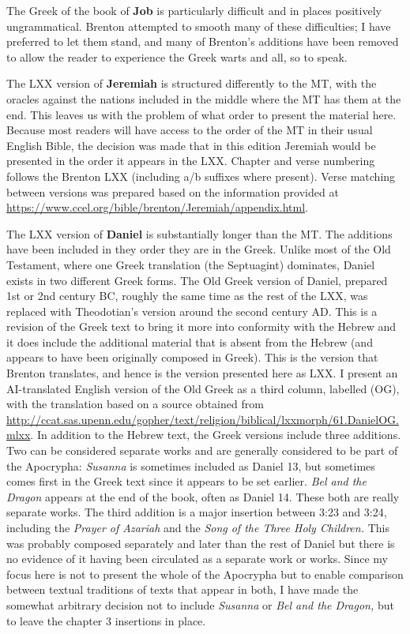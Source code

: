 {{The Greek of the book of \textbf{Job} is particularly difficult and in places positively ungrammatical. Brenton attempted to smooth many of these difficulties; I have preferred to let them stand, and many of Brenton's additions have been removed to allow the reader to experience the Greek warts and all, so to speak.

The LXX version of \textbf{Jeremiah} is structured differently to the MT, with the oracles against the nations included in the middle where the MT has them at the end. This leaves us with the problem of what order to present the material here. Because most readers will have access to the order of the MT in their usual English Bible, the decision was made that in this edition Jeremiah would be presented in the order it appears in the LXX. Chapter and verse numbering follows
the Brenton LXX (including a/b suffixes where present). Verse matching between versions was prepared based on the information provided at \url{https://www.ccel.org/bible/brenton/Jeremiah/appendix.html}. 

The LXX version of \textbf{Daniel} is substantially longer than the MT.  The additions have been included in they order they are in the Greek. Unlike most of the Old Testament, where one Greek translation (the Septuagint) dominates, Daniel exists in two different Greek forms. The Old Greek version of Daniel, prepared 1st or 2nd century BC, roughly the same time as the rest of the LXX, was replaced with Theodotian's version around the second century AD. This is a revision of the Greek text to bring it more into conformity with the Hebrew and it does include the additional material that is absent from the Hebrew (and appears to have been originally composed in Greek). This is the version that Brenton translates, and hence is the version presented here as LXX. I present an AI-translated English version of the Old Greek as a third column, labelled (OG), with the translation based on a source obtained from \url{http://ccat.sas.upenn.edu/gopher/text/religion/biblical/lxxmorph/61.DanielOG.mlxx}. In addition to the Hebrew text, the Greek versions include three additions. Two can be considered separate works and are generally considered to be part of the Apocrypha: \textit{Susanna}\/ is sometimes included as Daniel 13, but sometimes comes first in the Greek text since it appears to be set earlier. \textit{Bel and the Dragon}\/ appears at the end of the book, often as Daniel 14. These both are really separate works. The third addition is a major insertion between 3:23 and 3:24, including the \textit{Prayer of Azariah} and the \textit{Song of the Three Holy Children.}\/ This was probably composed separately and later than the rest of Daniel but there is no evidence of it having been circulated as a separate work or works. Since my focus here is not to present the whole of the Apocrypha but to enable comparison between textual traditions of texts that appear in both, I have made the somewhat arbitrary decision not to include \textit{Susanna}\/ or \textit{Bel and the Dragon,}\/ but to leave the chapter 3 insertions in place.

}}
